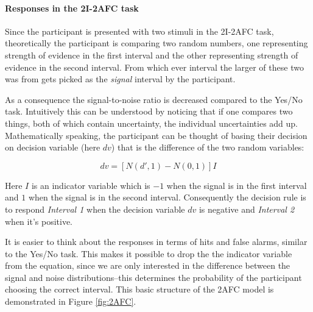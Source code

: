 \documentclass{article}\usepackage{knitr}
\begin{document}
\paragraph{Responses in the 2I-2AFC task}

Since the participant is presented with two stimuli in the 2I-2AFC task, theoretically the participant is comparing two random numbers, one representing strength  of evidence in the first interval and the other representing strength of evidence in the second interval. From which ever interval the larger of these two was from gets picked as the \textit{signal} interval by the participant.

As a consequence the signal-to-noise ratio is decreased compared to the Yes/No task. Intuitively this can be understood by noticing that if one compares two things, both of which contain uncertainty, the individual uncertainties add up. Mathematically speaking, the participant can be thought of basing their decision on decision variable (here $dv$) that is the difference of the two random variables:

\begin{equation}
dv = [N(d', 1) - N(0, 1)] I
\end{equation}

Here $I$ is an indicator variable which  is $-1$ when the signal is in the first interval and $1$ when the signal is in the second interval. Consequently the decision rule is to respond \textit{Interval 1} when the decision variable $dv$ is negative and \textit{Interval 2} when it's positive. 

It is easier to think about the responses in terms of hits and false alarms, similar to the Yes/No task. This makes it possible to drop the the indicator variable from the equation, since we are only interested in the difference between the signal and noise distributions--this determines the probability of the participant choosing the correct interval. This basic structure of the 2AFC model is demonstrated in Figure \ref{fig:2AFC}. 
\end{document}
